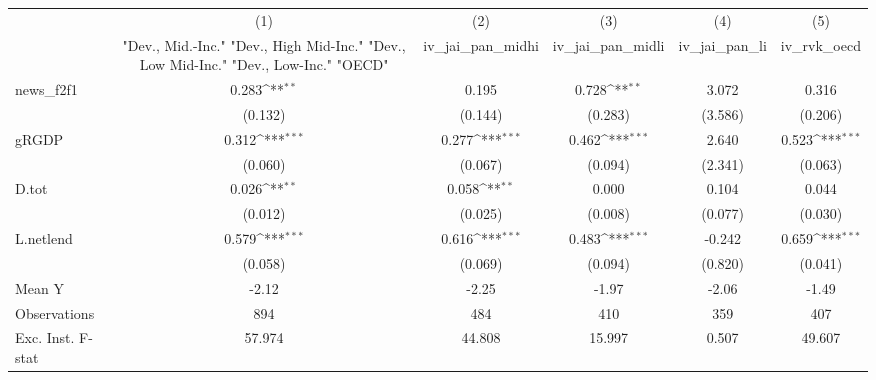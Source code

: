 {
\def\sym#1{\ifmmode^{#1}\else\(^{#1}\)\fi}
\begin{tabular}{l*{5}{c}}
\toprule
            &\multicolumn{1}{c}{(1)}&\multicolumn{1}{c}{(2)}&\multicolumn{1}{c}{(3)}&\multicolumn{1}{c}{(4)}&\multicolumn{1}{c}{(5)}\\
            &\multicolumn{1}{c}{ "Dev., Mid.-Inc." "Dev., High Mid-Inc." "Dev., Low Mid-Inc." "Dev., Low-Inc." "OECD" }&\multicolumn{1}{c}{iv\_jai\_pan\_midhi}&\multicolumn{1}{c}{iv\_jai\_pan\_midli}&\multicolumn{1}{c}{iv\_jai\_pan\_li}&\multicolumn{1}{c}{iv\_rvk\_oecd}\\
\midrule
news\_f2f1   &       0.283\sym{**} &       0.195         &       0.728\sym{**} &       3.072         &       0.316         \\
            &     (0.132)         &     (0.144)         &     (0.283)         &     (3.586)         &     (0.206)         \\
\addlinespace
gRGDP       &       0.312\sym{***}&       0.277\sym{***}&       0.462\sym{***}&       2.640         &       0.523\sym{***}\\
            &     (0.060)         &     (0.067)         &     (0.094)         &     (2.341)         &     (0.063)         \\
\addlinespace
D.tot       &       0.026\sym{**} &       0.058\sym{**} &       0.000         &       0.104         &       0.044         \\
            &     (0.012)         &     (0.025)         &     (0.008)         &     (0.077)         &     (0.030)         \\
\addlinespace
L.netlend   &       0.579\sym{***}&       0.616\sym{***}&       0.483\sym{***}&      -0.242         &       0.659\sym{***}\\
            &     (0.058)         &     (0.069)         &     (0.094)         &     (0.820)         &     (0.041)         \\
\midrule
Mean Y      &       -2.12         &       -2.25         &       -1.97         &       -2.06         &       -1.49         \\
Observations&         894         &         484         &         410         &         359         &         407         \\
Exc. Inst. F-stat&      57.974         &      44.808         &      15.997         &       0.507         &      49.607         \\
\bottomrule
\end{tabular}
}
